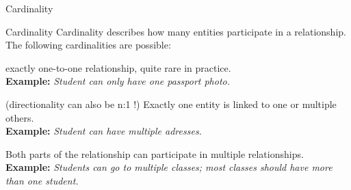 \begin{frame}{Cardinality}

\begin{alertblock}{Cardinality}\small
Cardinality describes how many entities participate in a relationship. The following cardinalities are possible:
  \begin{description}\footnotesize
      \item[1:1] exactly one-to-one relationship, quite rare in practice.  \\\textbf{\scriptsize Example:} \emph{\scriptsize Student can only have one passport photo.}
      \item[1:n] (directionality can also be n:1 !) Exactly one entity is linked to one or multiple others.  \\\textbf{\scriptsize Example:} \emph{\scriptsize Student can have multiple adresses.}
      \item[n:m] Both parts of the relationship can participate in multiple relationships. \\\textbf{\scriptsize Example:} \emph{\scriptsize Students can go to multiple classes; most classes should have more than one student.}
  \end{description}
\end{alertblock}

\end{frame}

